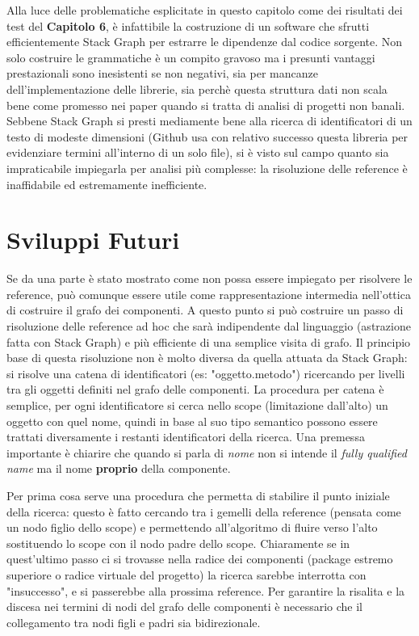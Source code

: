 Alla luce delle problematiche esplicitate in questo capitolo come dei risultati dei test del \textbf{Capitolo 6}, \`e infattibile la costruzione di un software che sfrutti efficientemente Stack Graph per estrarre le dipendenze dal codice sorgente. Non solo costruire le grammatiche \`e un compito gravoso ma i presunti vantaggi prestazionali sono inesistenti se non negativi, sia per mancanze dell'implementazione delle librerie, sia perch\`e questa struttura dati non scala bene come promesso nei paper quando si tratta di analisi di progetti non banali. Sebbene Stack Graph si presti mediamente bene alla ricerca di identificatori di un testo di modeste dimensioni (Github usa con relativo successo questa libreria per evidenziare termini all'interno di un solo file), si \`e visto sul campo quanto sia impraticabile impiegarla per analisi pi\`u complesse: la risoluzione delle reference \`e inaffidabile ed estremamente inefficiente.

\section{Sviluppi Futuri}

Se da una parte \`e stato mostrato come non possa essere impiegato per risolvere le reference, pu\`o comunque essere utile come rappresentazione intermedia nell'ottica di costruire il grafo dei componenti. A questo punto si pu\`o costruire un passo di risoluzione delle reference ad hoc che sar\`a indipendente dal linguaggio (astrazione fatta con Stack Graph) e pi\`u efficiente di una semplice visita di grafo. Il principio base di questa risoluzione non \`e molto diversa da quella attuata da Stack Graph: si risolve una catena di identificatori (es: "oggetto.metodo") ricercando per livelli tra gli oggetti definiti nel grafo delle componenti. La procedura per catena \`e semplice, per ogni identificatore si cerca nello scope (limitazione dall'alto) un oggetto con quel nome, quindi in base al suo tipo semantico possono essere trattati diversamente i restanti identificatori della ricerca. Una premessa importante \`e chiarire che quando si parla di \emph{nome} non si intende il \emph{fully qualified name} ma il nome \textbf{proprio} della componente.

Per prima cosa serve una procedura che permetta di stabilire il punto iniziale della ricerca: questo \`e fatto cercando tra i gemelli della reference (pensata come un nodo figlio dello scope) e permettendo all'algoritmo di fluire verso l'alto sostituendo lo scope con il nodo padre dello scope. Chiaramente se in quest'ultimo passo ci si trovasse nella radice dei componenti (package estremo superiore o radice virtuale del progetto) la ricerca sarebbe interrotta con "insuccesso", e si passerebbe alla prossima reference. Per garantire la risalita e la discesa nei termini di nodi del grafo delle componenti \`e necessario che il collegamento tra nodi figli e padri sia bidirezionale.


